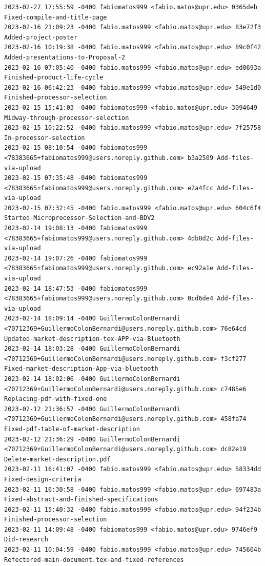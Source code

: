\documentclass[12pt]{article}
\begin{document}
\begin{lstlisting}
2023-02-27 17:55:59 -0400 fabiomatos999 <fabio.matos@upr.edu> 0365deb Fixed-compile-and-title-page
2023-02-16 21:09:23 -0400 fabio.matos999 <fabio.matos@upr.edu> 83e72f3 Added-project-poster
2023-02-16 10:19:38 -0400 fabio.matos999 <fabio.matos@upr.edu> 89c0f42 Added-presentations-to-Proposal-2
2023-02-16 07:05:40 -0400 fabio.matos999 <fabio.matos@upr.edu> ed0693a Finished-product-life-cycle
2023-02-16 06:42:23 -0400 fabio.matos999 <fabio.matos@upr.edu> 549e1d0 Finished-processor-selection
2023-02-15 15:41:03 -0400 fabiomatos999 <fabio.matos@upr.edu> 3094649 Midway-through-processor-selection
2023-02-15 10:22:52 -0400 fabio.matos999 <fabio.matos@upr.edu> 7f25758 In-processor-selection
2023-02-15 08:10:54 -0400 fabiomatos999 <78383665+fabiomatos999@users.noreply.github.com> b3a2509 Add-files-via-upload
2023-02-15 07:35:48 -0400 fabiomatos999 <78383665+fabiomatos999@users.noreply.github.com> e2a4fcc Add-files-via-upload
2023-02-15 07:32:45 -0400 fabio.matos999 <fabio.matos@upr.edu> 604c6f4 Started-Microprocessor-Selection-and-BDV2
2023-02-14 19:08:13 -0400 fabiomatos999 <78383665+fabiomatos999@users.noreply.github.com> 4db8d2c Add-files-via-upload
2023-02-14 19:07:26 -0400 fabiomatos999 <78383665+fabiomatos999@users.noreply.github.com> ec92a1e Add-files-via-upload
2023-02-14 18:47:53 -0400 fabiomatos999 <78383665+fabiomatos999@users.noreply.github.com> 0cd6de4 Add-files-via-upload
2023-02-14 18:09:14 -0400 GuillermoColonBernardi <70712369+GuillermoColonBernardi@users.noreply.github.com> 76e64cd Updated-market-description-tex-APP-via-Bluetooth
2023-02-14 18:03:28 -0400 GuillermoColonBernardi <70712369+GuillermoColonBernardi@users.noreply.github.com> f3cf277 Fixed-market-description-App-via-bluetooth
2023-02-14 18:02:06 -0400 GuillermoColonBernardi <70712369+GuillermoColonBernardi@users.noreply.github.com> c7485e6 Replacing-pdf-with-fixed-one
2023-02-12 21:36:57 -0400 GuillermoColonBernardi <70712369+GuillermoColonBernardi@users.noreply.github.com> 458fa74 Fixed-pdf-table-of-market-description
2023-02-12 21:36:29 -0400 GuillermoColonBernardi <70712369+GuillermoColonBernardi@users.noreply.github.com> dc82e19 Delete-market-description.pdf
2023-02-11 16:41:07 -0400 fabio.matos999 <fabio.matos@upr.edu> 58334dd Fixed-design-criteria
2023-02-11 16:30:58 -0400 fabio.matos999 <fabio.matos@upr.edu> 697483a Fixed-abstract-and-finished-specifications
2023-02-11 15:40:32 -0400 fabio.matos999 <fabio.matos@upr.edu> 94f234b Finished-processor-selection
2023-02-11 14:09:48 -0400 fabiomatos999 <fabio.matos@upr.edu> 9746ef9 Did-research
2023-02-11 10:04:59 -0400 fabio.matos999 <fabio.matos@upr.edu> 745604b Refectored-main-document.tex-and-fixed-references

\end{lstlisting}
\end{document}
